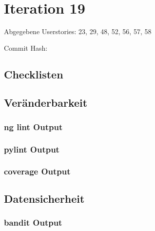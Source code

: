 \section*{Iteration 19}
	Abgegebene Userstories: 23, 29, 48, 52, 56, 57, 58
	
	Commit Hash: 
	
	\subsection{Checklisten}
	
	
	
	
	

	\subsection*{Veränderbarkeit}
	\subsubsection*{ng lint Output}
	

	\subsubsection*{pylint Output}
	

	\subsubsection*{coverage Output}
	

	\subsection*{Datensicherheit}

	\subsubsection*{bandit Output}
	
